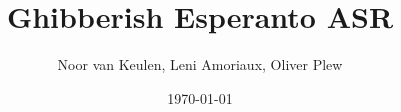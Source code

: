 \author{Noor van Keulen, Leni Amoriaux, Oliver Plew}
\subject{Speech Recognition (ELEC E5510), 2026}
\title{Ghibberish Esperanto ASR}
\date{\today}

\makeatletter
\newcommand {\Schlagworte}           {}
\newcommand {\TypDerArbeit}          {Literature study}
\newcommand {\Course}                {Speech Recognition}
\newcommand {\Fakultaet}             {School of Electrical Engineering}
\newcommand {\Fachgebiet}            {Department of lnformation and Communications Engineering}
\newcommand {\Professor}             {Prof. Dr. Mikko Kurimo}
\newcommand {\Betreuer}              {M.Sc. Yaroslav Getman}
\newcommand {\NameDesAutors}         {\@author}
\newcommand {\eingereichtAm}         {\@date}
\makeatother
